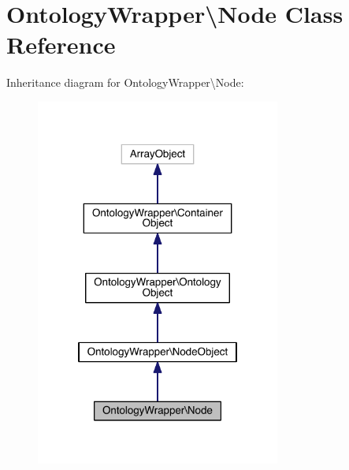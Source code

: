 \hypertarget{class_ontology_wrapper_1_1_node}{\section{Ontology\-Wrapper\textbackslash{}Node Class Reference}
\label{class_ontology_wrapper_1_1_node}
}


Inheritance diagram for Ontology\-Wrapper\textbackslash{}Node\-:\nopagebreak
\begin{figure}[H]
\begin{center}
\leavevmode
\includegraphics[width=228pt]{class_ontology_wrapper_1_1_node__inherit__graph}
\end{center}
\end{figure}


